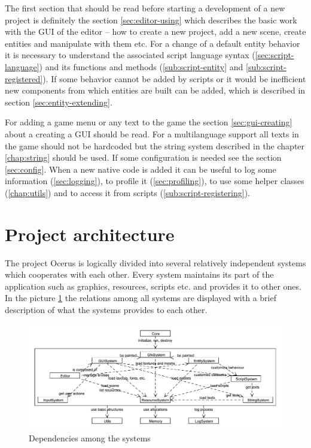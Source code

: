 \documentclass[a4paper, 12pt]{report}
\begin{document}
The first section that should be read before starting a development of a new project is definitely the section \ref{sec:editor-using} which describes the basic work with the GUI of the editor -- how to create a new project, add a new scene, create entities and manipulate with them etc. For a change of a default entity behavior it is necessary to understand the associated script language syntax (\ref{sec:script-language}) and its functions and methods (\ref{sub:script-entity} and \ref{sub:script-registered}). If some behavior cannot be added by scripts or it would be inefficient new components from which entities are built can be added, which is described in section \ref{sec:entity-extending}.

For adding a game menu or any text to the game the section \ref{sec:gui-creating} about a creating a GUI should be read. For a multilanguage support all texts in the game should not be hardcoded but the string system described in the chapter \ref{chap:string} should be used. If some configuration is needed see the section \ref{sec:config}. When a new native code is added it can be useful to log some information (\ref{sec:logging}), to profile it (\ref{sec:profiling}), to use some helper classes (\ref{chap:utils}) and to access it from scripts (\ref{sub:script-registering}).

\section{Project architecture}

The project Ocerus is logically divided into several relatively independent systems which cooperates with each other. Every system maintains its part of the application such as graphics, resources, scripts etc. and provides it to other ones. In the picture \ref{fig:system-connection} the relations among all systems are displayed with a brief description of what the systems provides to each other.

\begin{figure}[htbp]
	\centering
		\includegraphics[width=1\textwidth]{SystemConnection.pdf}
	\caption{Dependencies among the systems}
	\label{fig:system-connection}
\end{figure}
\end{document}
